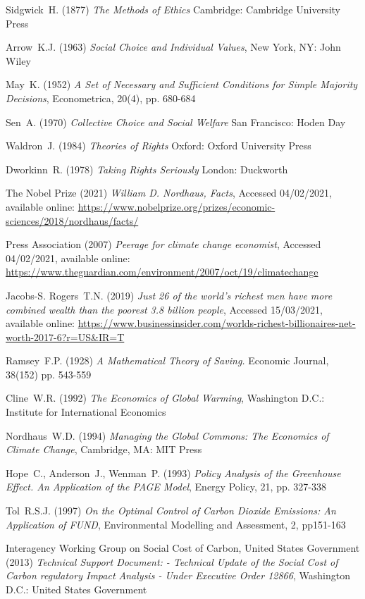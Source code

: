 \documentclass[11pt, oneside]{book}   	%
\begin{document}
\begin{thebibliography}{99}
 Sidgwick~H. (1877)
\emph{The Methods of Ethics}
Cambridge: Cambridge University Press
	
 Arrow~K.J. (1963)
\emph{Social Choice and Individual Values},
New York, NY: John Wiley
	
 May~K. (1952)
\emph{A Set of Necessary and Sufficient Conditions for Simple Majority Decisions},
Econometrica, 20(4), pp. 680-684
	
 Sen~A. (1970)
\emph{Collective Choice and Social Welfare}
San Francisco: Hoden Day
	
 Waldron~J. (1984)
\emph{Theories of Rights}
Oxford: Oxford University Press
	
 Dworkinn~R. (1978)
\emph{Taking Rights Seriously}
London: Duckworth
	
 The Nobel Prize (2021)
\emph{William D. Nordhaus, Facts},
Accessed 04/02/2021, available online: 
\url{https://www.nobelprize.org/prizes/economic-sciences/2018/nordhaus/facts/}
	
 Press Association (2007)
\emph{Peerage for climate change economist},
Accessed 04/02/2021, available online: 
\url{https://www.theguardian.com/environment/2007/oct/19/climatechange}
	
 Jacobs-S. Rogers~T.N. (2019)
\emph{Just 26 of the world's richest men have more combined wealth than the poorest 3.8 billion people},
Accessed 15/03/2021, available online: 
\url{https://www.businessinsider.com/worlds-richest-billionaires-net-worth-2017-6?r=US&IR=T}
	
 Ramsey~F.P. (1928)
\emph{A Mathematical Theory of Saving.}
Economic Journal, 38(152) pp. 543-559
	
 Cline~W.R. (1992)
\emph{The Economics of Global Warming},
Washington D.C.: Institute for International Economics
	
 Nordhaus~W.D. (1994)
\emph{Managing the Global Commons: The Economics of Climate Change},
Cambridge, MA: MIT Press
	
 Hope~C., Anderson~J., Wenman~P. (1993)
\emph{Policy Analysis of the Greenhouse Effect. An Application of the PAGE Model},
Energy Policy, 21, pp. 327-338
	
 Tol~R.S.J. (1997)
\emph{On the Optimal Control of Carbon Dioxide Emissions: An Application of FUND},
Environmental Modelling and Assessment, 2, pp151-163
	
 Interagency Working Group on Social Cost of Carbon, United States Government (2013)
\emph{Technical Support Document: - Technical Update of the Social Cost of Carbon regulatory Impact Analysis - Under Executive Order 12866},
Washington D.C.: United States Government
	

\end{thebibliography}
\end{document}
